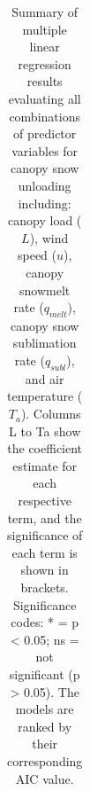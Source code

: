 \documentclass[
  letterpaper,
  DIV=11,
  numbers=noendperiod]{scrartcl}
\begin{document}
\begin{longtable}[]{@{}
  >{\raggedright\arraybackslash}p{}
  >{\raggedright\arraybackslash}p{}
  >{\raggedright\arraybackslash}p{}
  >{\raggedright\arraybackslash}p{}
  >{\raggedright\arraybackslash}p{}
  >{\raggedright\arraybackslash}p{}
  >{\raggedright\arraybackslash}p{}
  >{\raggedright\arraybackslash}p{}
  >{\raggedleft\arraybackslash}p{}
  >{\raggedleft\arraybackslash}p{}@{}}

\caption{\label{tbl-q-unld-bins-full}Summary of multiple linear
regression results evaluating all combinations of predictor variables
for canopy snow unloading including: canopy load (\(L\)), wind speed
(\(u\)), canopy snowmelt rate (\(q_{melt}\)), canopy snow sublimation
rate (\(q_{subl}\)), and air temperature (\(T_a\)). Columns L to Ta show
the coefficient estimate for each respective term, and the significance
of each term is shown in brackets. Significance codes: * = p \textless{}
0.05; ns = not significant (p \textgreater{} 0.05). The models are
ranked by their corresponding AIC value.}

\tabularnewline


\end{longtable}
\end{document}
